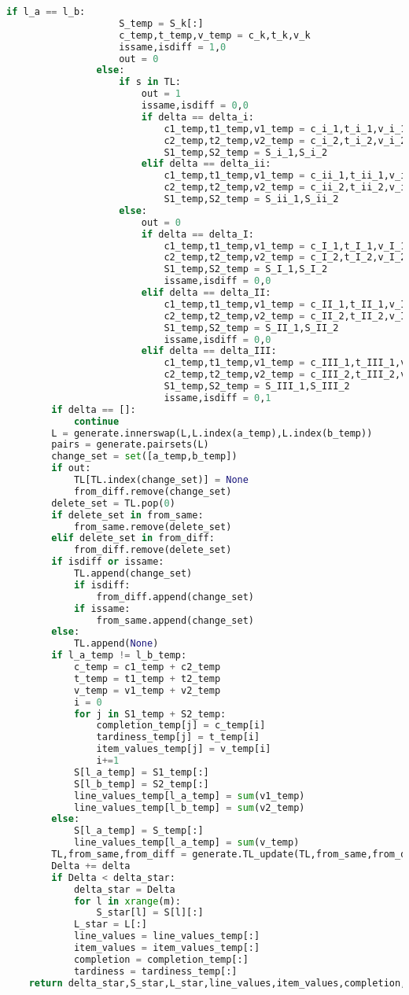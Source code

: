 \begin{lstlisting}[language = Python]
				if l_a == l_b:
					S_temp = S_k[:]
					c_temp,t_temp,v_temp = c_k,t_k,v_k
					issame,isdiff = 1,0
					out = 0
				else:
					if s in TL:
						out = 1
						issame,isdiff = 0,0
						if delta == delta_i:
							c1_temp,t1_temp,v1_temp = c_i_1,t_i_1,v_i_1
							c2_temp,t2_temp,v2_temp = c_i_2,t_i_2,v_i_2
							S1_temp,S2_temp = S_i_1,S_i_2
						elif delta == delta_ii:
							c1_temp,t1_temp,v1_temp = c_ii_1,t_ii_1,v_ii_1
							c2_temp,t2_temp,v2_temp = c_ii_2,t_ii_2,v_ii_2
							S1_temp,S2_temp = S_ii_1,S_ii_2
					else:
						out = 0
						if delta == delta_I:
							c1_temp,t1_temp,v1_temp = c_I_1,t_I_1,v_I_1
							c2_temp,t2_temp,v2_temp = c_I_2,t_I_2,v_I_2
							S1_temp,S2_temp = S_I_1,S_I_2
							issame,isdiff = 0,0
						elif delta == delta_II:
							c1_temp,t1_temp,v1_temp = c_II_1,t_II_1,v_II_1
							c2_temp,t2_temp,v2_temp = c_II_2,t_II_2,v_II_2
							S1_temp,S2_temp = S_II_1,S_II_2
							issame,isdiff = 0,0
						elif delta == delta_III:
							c1_temp,t1_temp,v1_temp = c_III_1,t_III_1,v_III_1
							c2_temp,t2_temp,v2_temp = c_III_2,t_III_2,v_III_2
							S1_temp,S2_temp = S_III_1,S_III_2
							issame,isdiff = 0,1
		if delta == []:
			continue
		L = generate.innerswap(L,L.index(a_temp),L.index(b_temp))
		pairs = generate.pairsets(L)
		change_set = set([a_temp,b_temp])
		if out:
			TL[TL.index(change_set)] = None
			from_diff.remove(change_set)
		delete_set = TL.pop(0)
		if delete_set in from_same:
			from_same.remove(delete_set)
		elif delete_set in from_diff:
			from_diff.remove(delete_set)
		if isdiff or issame:			
			TL.append(change_set)
			if isdiff:
				from_diff.append(change_set)
			if issame:
				from_same.append(change_set)
		else:
			TL.append(None)
		if l_a_temp != l_b_temp:
			c_temp = c1_temp + c2_temp
			t_temp = t1_temp + t2_temp
			v_temp = v1_temp + v2_temp
			i = 0
			for j in S1_temp + S2_temp:
				completion_temp[j] = c_temp[i]
				tardiness_temp[j] = t_temp[i]
				item_values_temp[j] = v_temp[i]
				i+=1
			S[l_a_temp] = S1_temp[:]
			S[l_b_temp] = S2_temp[:]
			line_values_temp[l_a_temp] = sum(v1_temp)
			line_values_temp[l_b_temp] = sum(v2_temp)
		else:
			S[l_a_temp] = S_temp[:]
			line_values_temp[l_a_temp] = sum(v_temp)
		TL,from_same,from_diff = generate.TL_update(TL,from_same,from_diff,S)
		Delta += delta
		if Delta < delta_star:
			delta_star = Delta
			for l in xrange(m):
				S_star[l] = S[l][:]
			L_star = L[:]
			line_values = line_values_temp[:]
			item_values = item_values_temp[:]
			completion = completion_temp[:]
			tardiness = tardiness_temp[:]
	return delta_star,S_star,L_star,line_values,item_values,completion,tardiness


\end{lstlisting}
